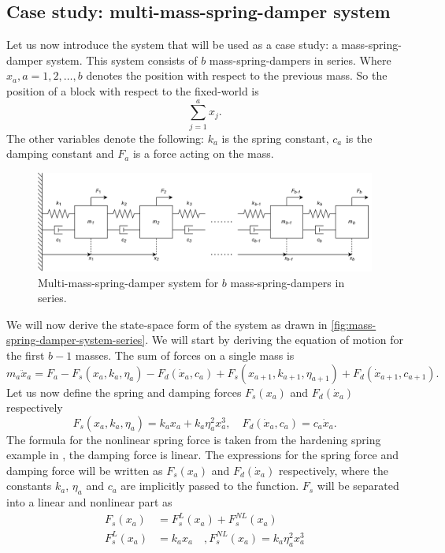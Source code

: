 \subsection{Case study: multi-mass-spring-damper system}
Let us now introduce the system that will be used as a case study: a mass-spring-damper system. This system consists of $b$ mass-spring-dampers in series. Where $x_a,a=1,2,\dots,b$ denotes the position with respect to the previous mass. So the position of a block with respect to the fixed-world is
\begin{equation}\label{eqn:mass-position-wrt-fixed-world}
    \sum^{a}_{j=1}x_j.
\end{equation}
The other variables denote the following: $k_a$ is the spring constant, $c_a$ is the damping constant and $F_a$ is a force acting on the mass.
\begin{figure}[ht]
    \centering
    \includegraphics[width=0.9\linewidth]{report/Figures/Mass-spring-damper system.png}
    \caption{Multi-mass-spring-damper system for $b$ mass-spring-dampers in series.}
    \label{fig:mass-spring-damper-system-series}
\end{figure}

We will now derive the state-space form of the system as drawn in \autoref{fig:mass-spring-damper-system-series}. We will start by deriving the equation of motion for the first $b-1$ masses. The sum of forces on a single mass is
\begin{equation}\label{eqn:free-body-equation}
    m_a\ddot{x}_a = F_a - F_s(x_a,k_a,\eta_a) - F_d(\dot{x}_a,c_a) + F_s(x_{a+1},k_{a+1},\eta_{a+1}) + F_d(\dot{x}_{a+1},c_{a+1}).
\end{equation}
Let us now define the spring and damping forces $F_s(x_a)$ and $F_d(\dot{x}_a)$ respectively
\begin{equation*}
    F_s(x_a,k_a,\eta_a) = k_ax_a + k_a \eta_a^2 x_a^3, \quad F_d(\dot{x}_a,c_a) = c_a\dot{x}_a.
\end{equation*}
The formula for the nonlinear spring force is taken from the hardening spring example in \cite[Section 1.2.3]{Khalil2002NonlinearSystems}, the damping force is linear. The expressions for the spring force and damping force will be written as $F_s(x_a)$ and $F_d(\dot{x}_a)$ respectively, where the constants $k_a$, $\eta_a$ and $c_a$ are implicitly passed to the function. $F_s$ will be separated into a linear and nonlinear part as
\begin{equation}\label{eqn:nonlinear-spring}
    \begin{split}
        F_s(x_a) &= F_s^L(x_a) + F_s^{NL}(x_a) \\
        F_s^L(x_a) &= k_ax_a \quad , F_s^{NL}(x_a) = k_a\eta_a^2x^3_a
    \end{split}    
\end{equation}

